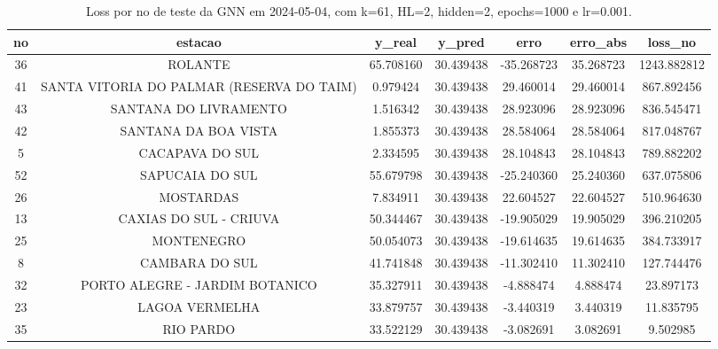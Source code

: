 \begin{table}[h]
\centering
\caption{Loss por no de teste da GNN em 2024-05-04, com k=61, HL=2, hidden=2, epochs=1000 e lr=0.001.}
\label{tab:gnn_loss_k61_hl2_h2_e1000_d20240504}
\begin{tabular}{ccccccc}
\toprule
no & estacao & y\_real & y\_pred & erro & erro\_abs & loss\_no \\
\midrule
36 & ROLANTE & 65.708160 & 30.439438 & -35.268723 & 35.268723 & 1243.882812 \\
41 & SANTA VITORIA DO PALMAR (RESERVA DO TAIM) & 0.979424 & 30.439438 & 29.460014 & 29.460014 & 867.892456 \\
43 & SANTANA DO LIVRAMENTO & 1.516342 & 30.439438 & 28.923096 & 28.923096 & 836.545471 \\
42 & SANTANA DA BOA VISTA & 1.855373 & 30.439438 & 28.584064 & 28.584064 & 817.048767 \\
5 & CACAPAVA DO SUL & 2.334595 & 30.439438 & 28.104843 & 28.104843 & 789.882202 \\
52 & SAPUCAIA DO SUL & 55.679798 & 30.439438 & -25.240360 & 25.240360 & 637.075806 \\
26 & MOSTARDAS & 7.834911 & 30.439438 & 22.604527 & 22.604527 & 510.964630 \\
13 & CAXIAS DO SUL - CRIUVA & 50.344467 & 30.439438 & -19.905029 & 19.905029 & 396.210205 \\
25 & MONTENEGRO & 50.054073 & 30.439438 & -19.614635 & 19.614635 & 384.733917 \\
8 & CAMBARA DO SUL & 41.741848 & 30.439438 & -11.302410 & 11.302410 & 127.744476 \\
32 & PORTO ALEGRE - JARDIM BOTANICO & 35.327911 & 30.439438 & -4.888474 & 4.888474 & 23.897173 \\
23 & LAGOA VERMELHA & 33.879757 & 30.439438 & -3.440319 & 3.440319 & 11.835795 \\
35 & RIO PARDO & 33.522129 & 30.439438 & -3.082691 & 3.082691 & 9.502985 \\
\bottomrule
\end{tabular}
\end{table}
